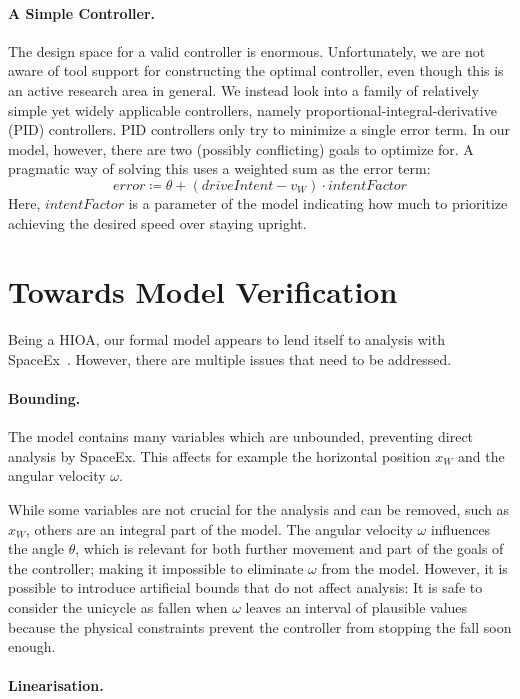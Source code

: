 \documentclass[copyright,submission]{eptcs}
\newcommand{\mi}[1]{\mathit{#1}}
\begin{document}
\paragraph{A Simple Controller.}
The design space for a valid controller is enormous. Unfortunately, we
are not aware of tool support for constructing the optimal controller,
even though this is an active research area in general. We instead
look into a family of relatively simple yet widely applicable controllers,
namely proportional-integral-derivative (PID) controllers.
PID controllers only try to minimize a single
error term. In our model, however, there are two (possibly
conflicting) goals to optimize for. A pragmatic way of solving this
uses a weighted sum as the error term:
\[ \mi{error} \coloneqq \theta + (\mi{driveIntent} - v_W) \cdot \mi{intentFactor}
\]
Here, $\mi{intentFactor}$ is a parameter of the model indicating how
much to prioritize achieving the desired speed over staying upright.


\section{Towards Model Verification}\label{sect:verification}

Being a HIOA, our formal model appears to lend itself to analysis with
SpaceEx~\cite{DBLP:conf/cav/FrehseGDCRLRGDM11}. However, there are
multiple issues that need to be addressed.


\paragraph{Bounding.}
The model contains many variables which are unbounded, preventing direct analysis by SpaceEx. This affects for example the horizontal position $x_W$ and the angular velocity $\omega$.

While some variables are not crucial for the analysis and can be removed, such as $x_W$, others are an integral part of the model. The angular velocity $\omega$ influences the angle $\theta$, which is relevant for both further movement and part of the goals of the controller; making it impossible to eliminate $\omega$ from the model.
However, it is possible to introduce artificial bounds that do not affect analysis: It is safe to consider the unicycle as fallen when $\omega$ leaves an interval of plausible values because the physical constraints prevent the controller from stopping the fall soon enough.


\paragraph{Linearisation.}
\end{document}
